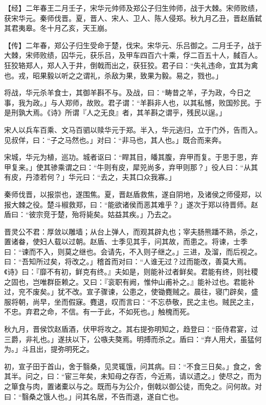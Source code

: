 \documentclass[]{article}
\begin{document}
【经】二年春王二月壬子，宋华元帅师及郑公子归生帅师，战于大棘。宋师败绩，获宋华元。秦师伐晋。夏，晋人、宋人、卫人、陈人侵郑。秋九月乙丑，晋赵盾弑其君夷皋。冬十月乙亥，天王崩。

【传】二年春，郑公子归生受命于楚，伐宋。宋华元、乐吕御之。二月壬子，战于大棘，宋师败绩，囚华元，获乐吕，及甲车四百六十乘，俘二百五十人，馘百人。狂狡辂郑人，郑人入于井，倒戟而出之，获狂狡。君子曰：``失礼违命，宜其为禽也。戎，昭果毅以听之之谓礼，杀敌为果，致果为毅。易之，戮也。」

将战，华元杀羊食士，其御羊斟不与。及战，曰：``畴昔之羊，子为政，今日之事，我为政。」与人郑师，故败。君子谓：``羊斟非人也，以其私憾，败国殄民。于是刑孰大焉。《诗》所谓『人之无良』者，其羊斟之谓乎，残民以逞。」

宋人以兵车百乘、文马百驷以赎华元于郑。半入，华元逃归，立于门外，告而入。见叔佯，曰：``子之马然也。」对曰：``非马也，其人也。」既合而来奔。

宋城，华元为植，巡功。城者讴曰：``睅其目，皤其腹，弃甲而复。于思于思，弃甲复来。」使其骖乘谓之曰：``牛则有皮，犀兕尚多，弃甲则那？」役人曰：``从其有皮，丹漆若何？」华元曰：``去之，夫其口众我寡。」

秦师伐晋，以报崇也，遂围焦。夏，晋赵盾救焦，遂自阴地，及诸侯之师侵郑，以报大棘之役。楚斗椒救郑，曰：``能欲诸侯而恶其难乎？」遂次于郑以待晋师。赵盾曰：``彼宗竞于楚，殆将毙矣。姑益其疾。」乃去之。

晋灵公不君：厚敛以雕墙；从台上弹人，而观其辟丸也；宰夫肠熊蹯不熟，杀之，置诸畚，使妇人载以过朝。赵盾、士季见其手，问其故，而患之。将谏，士季曰：``谏而不入，则莫之继也。会请先，不入则子继之。」三进，及溜，而后视之。曰：``吾知所过矣，将改之。」稽首而对曰：``人谁无过？过而能改，善莫大焉。《诗》曰：『靡不有初，鲜克有终。』夫如是，则能补过者鲜矣。君能有终，则社稷之固也，岂唯群臣赖之。又曰：『衮职有阙，惟仲山甫补之。』能补过也。君能补过，兖不废矣。」犹不改。宣子骤谏，公患之，使锄麑贼之。晨往，寝门辟矣，盛服将朝，尚早，坐而假寐。麑退，叹而言曰：``不忘恭敬，民之主也。贼民之主，不忠。弃君之命，不信。有一于此，不如死也。」触槐而死。

秋九月，晋侯饮赵盾酒，伏甲将攻之。其右提弥明知之，趋登曰：``臣侍君宴，过三爵，非礼也。」遂扶以下，公嗾夫獒焉。明搏而杀之。盾曰：``弃人用犬，虽猛何为。」斗且出，提弥明死之。

初，宣子田于首山，舍于翳桑，见灵辄饿，问其病。曰：``不食三日矣。」食之，舍其半。问之，曰：``宦三年矣，未知母之存否，今近焉，请以遗之。」使尽之，而为之箪食与肉，置诸橐以与之。既而与为公介，倒戟以御公徒，而免之。问何故。对曰：``翳桑之饿人也。」问其名居，不告而退，遂自亡也。
\end{document}
